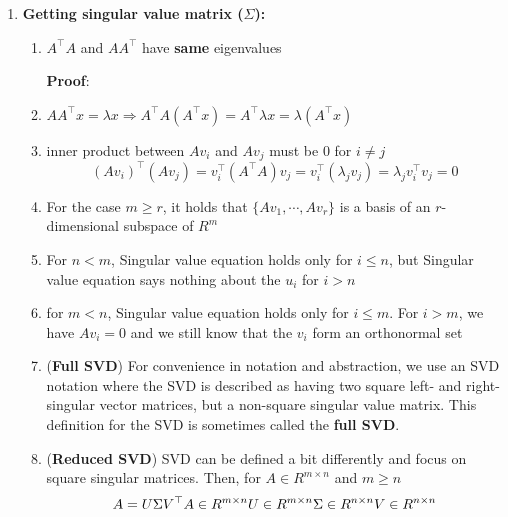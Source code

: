 \begin{enumerate}
\begin{enumerate}
        \vspace{0.5cm}
        \item \textbf{Getting singular value matrix ($\Sigma$):}
        \begin{enumerate}
            \item $A^\top A$ and $AA^\top$ have \textbf{same} eigenvalues

            \vspace{0.5cm}
            \textbf{Proof}:
            \item $AA^\top x = \lambda x \Rightarrow A^\top A(A^\top x) = A^\top \lambda x = \lambda (A^\top x)$

            \item inner product between $Av_i$ and $Av_j$ must be $0$ for $i \neq j$
            \[
                (Av_i)^\top(Av_j) = v_i^\top (A^\top A)v_j = v_i^\top(\lambda_jv_j) = \lambda_jv_i^\top v_j = 0
            \]

            \item For the case $m \geq r$, it holds that $\{Av_1, \cdots , Av_r\}$ is a basis of an $r$-dimensional subspace of $R^m$

            \item For $n < m$, Singular value equation holds only for $i \leq  n$, but Singular value equation says nothing about the $u_i$ for $i > n$

            \item for $m < n$, Singular value equation holds only for $i \leq  m$. For $i > m$, we have $Av_i = 0$ and we still know that the $v_i$ form an orthonormal set

            \item (\textbf{Full SVD}) For convenience in notation and abstraction, we use an SVD notation where the SVD is described as having two square left- and right-singular vector matrices, but a non-square singular value matrix. This definition for the SVD is sometimes called the \textbf{full SVD}.

            \item (\textbf{Reduced SVD}) SVD can be defined a bit differently and focus on square singular matrices. Then, for $A \in R^{m\times n}$ and $m \geq n$
            \[
                \hfill
                A = U\Sigma V^\top
                \hfill
                A \in  R^{m\times n}
                \hfill
                U \in  R^{m\times n}
                \hfill
                \Sigma  \in  R^{n\times n}
                \hfill
                V \in  R^{n\times n}
                \hfill
            \]


\end{enumerate}
\end{enumerate}
\end{enumerate}
